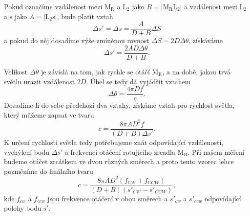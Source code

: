 \documentclass[english]{article}
\newcommand{\bb}[1]{\boldmath{}\textbf{$\mathrm{#1}$}\unboldmath{}}
\begin{document}
			Pokud označíme vzdálenost mezi \bb{M_R} a \bb{L_2} jako $B=$\bb{|M_RL_2|} a vzdálenost mezi \bb{L_2} a \bb{s} jako $A=$\bb{|L_2s|}, bude platit vztah
			\begin{equation}
				\Delta s' = \Delta s = \frac{A}{D+B}\Delta S
			\end{equation}
			a pokud do něj dosadíme výše zmíněnou rovnost $\Delta S = 2D\Delta\theta$, získáváme
			\begin{equation}
				\Delta s' = \frac{2AD\Delta\theta}{D+B}.
			\end{equation}
			
			Velikost $\Delta\theta$ je závislá na tom, jak rychle se otáčí \bb{M_R}, a na době, jakou trvá světlu urazit vzdálenost $2D$. Úhel se tedy dá vyjádřit vztahem
			\begin{equation}
				\Delta\theta = \frac{4\pi D f}{c}.
			\end{equation}
			Dosadíme-li do sebe předchozí dva vztahy, získáme vztah pro rychlost světla, který můžeme zapsat ve tvaru
			\begin{equation}
				c = \frac{8\pi A D^2 f}{\left(D+B\right)\Delta s'}.
				\label{eq:c}
			\end{equation}
			K určení rychlosti světla tedy potřebujeme znát odpovídající vzdálenosti, vychýlení bodu $\Delta s'$ a frekvenci otáčení rotujícího zrcadla \bb{M_R}. Při našem měření budeme otáčet zrcátkem ve dvou různých směrech a proto tento vzorec lehce pozměníme do finálního tvaru
			\begin{equation}
				c = \frac{8\pi A D^2 \left(f_{CW}+f_{CCW}\right)}{\left(D+B\right)\left(s'_{CW}-s'_{CCW}\right)},
				\label{eq:ccw}
			\end{equation}
			kde $f_{cw}$ a $f_{ccw}$ jsou frekvence otáčení v obou směrech a $s'_{cw}$ a $s'_{ccw}$ odpovídající polohy bodu \bb{s'}.
			
\end{document}
